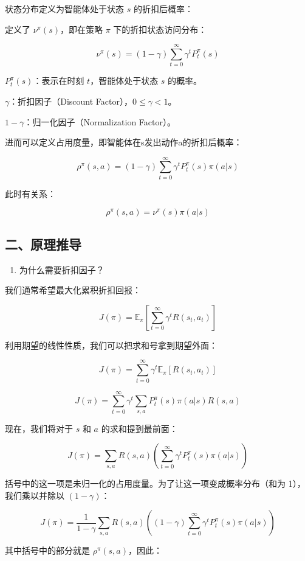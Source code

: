 状态分布定义为智能体处于状态 \(s\) 的折扣后概率：

定义了 \(\nu^\pi(s)\)，即在策略 \(\pi\) 下的折扣状态访问分布：

\[
\nu^\pi(s) = (1-\gamma)\sum_{t=0}^{\infty}\gamma^t P_t^\pi(s)
\]

\(P_t^\pi(s)\)：表示在时刻 \(t\)，智能体处于状态 \(s\) 的概率。

\(\gamma\)：折扣因子（Discount Factor），\(0 \le \gamma < 1\)。

\(1-\gamma\)：归一化因子（Normalization Factor）。

进而可以定义占用度量，即智能体在s发出动作a的折扣后概率：

\[
\rho^\pi(s,a) = (1-\gamma)\sum_{t=0}^{\infty}\gamma^t P_t^\pi(s)\pi(a|s)
\]

此时有关系：

\[
\rho^\pi(s,a) = \nu^\pi(s)\pi(a|s)
\]

\hypertarget{ux4e8cux539fux7406ux63a8ux5bfc}{%
\subsection{二、原理推导}\label{ux4e8cux539fux7406ux63a8ux5bfc}}

\begin{enumerate}
\def\labelenumi{\arabic{enumi}.}
\tightlist
\item
  为什么需要折扣因子？
\end{enumerate}

我们通常希望最大化累积折扣回报：

\[
J(\pi) = \mathbb{E}_\pi\left[\sum_{t=0}^{\infty}\gamma^t R(s_t,a_t)\right]
\]

利用期望的线性性质，我们可以把求和号拿到期望外面：

\[
J(\pi) = \sum_{t=0}^{\infty}\gamma^t\mathbb{E}_\pi[R(s_t,a_t)]
\]

\[
J(\pi) = \sum_{t=0}^{\infty}\gamma^t\sum_{s,a}P_t^\pi(s)\pi(a|s)R(s,a)
\]

现在，我们将对于 \(s\) 和 \(a\) 的求和提到最前面：

\[
J(\pi) = \sum_{s,a}R(s,a)\left(\sum_{t=0}^{\infty}\gamma^t P_t^\pi(s)\pi(a|s)\right)
\]

括号中的这一项是未归一化的占用度量。为了让这一项变成概率分布（和为 1），我们乘以并除以 \((1-\gamma)\)：

\[
J(\pi) = \frac{1}{1-\gamma}\sum_{s,a}R(s,a)\left((1-\gamma)\sum_{t=0}^{\infty}\gamma^t P_t^\pi(s)\pi(a|s)\right)
\]

其中括号中的部分就是 \(\rho^\pi(s,a)\)，因此：

